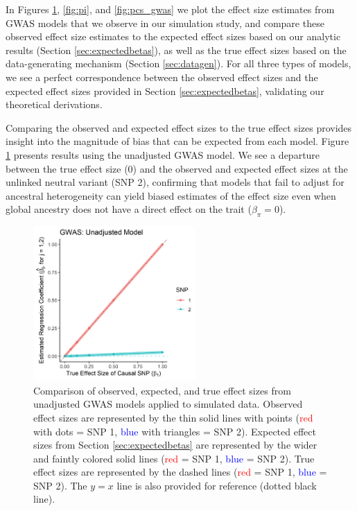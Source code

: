 \documentclass[12pt]{article}
\begin{document}
In Figures \ref{fig:unadjust}, \ref{fig:pi}, and \ref{fig:pcs_gwas} we plot the effect size estimates from GWAS models that we observe in our simulation study, and compare these observed effect size estimates to the expected effect sizes based on our analytic results (Section \ref{sec:expectedbetas}), as well as the true effect sizes based on the data-generating mechanism (Section \ref{sec:datagen}). 
For all three types of models, we see a perfect correspondence between the observed effect sizes and the expected effect sizes provided in Section \ref{sec:expectedbetas}, validating our theoretical derivations.

Comparing the observed and expected effect sizes to the true effect sizes provides insight into the magnitude of bias that can be expected from each model. 
Figure \ref{fig:unadjust} presents results using the unadjusted GWAS model.
We see a departure between the true effect size (0) and the observed and expected effect sizes at the unlinked neutral variant (SNP 2), confirming that models that fail to adjust for ancestral heterogeneity can yield biased estimates of the effect size even when global ancestry does not have a direct effect on the trait ($\beta_\pi = 0$).

\begin{figure}[!htb]
\centering
\includegraphics[width=0.55\textwidth]{figs/finalfigs/figS8_sims_unadjusted}
\caption[Observed versus expected and true effect sizes from unadjusted GWAS models.]%
{Comparison of observed, expected, and true effect sizes from unadjusted GWAS models applied to simulated data. Observed effect sizes are represented by the thin solid lines with points (\textcolor{red}{red} with dots = SNP 1, \textcolor{blue}{blue} with triangles = SNP 2). 
Expected effect sizes from Section \ref{sec:expectedbetas} are represented by the wider and faintly colored solid lines (\textcolor{red}{red} = SNP 1, \textcolor{blue}{blue} = SNP 2).
True effect sizes are represented by the dashed lines (\textcolor{red}{red} = SNP 1, \textcolor{blue}{blue} = SNP 2).
The $y = x$ line is also provided for reference (dotted black line).}
\label{fig:unadjust}
\end{figure}
\end{document}
